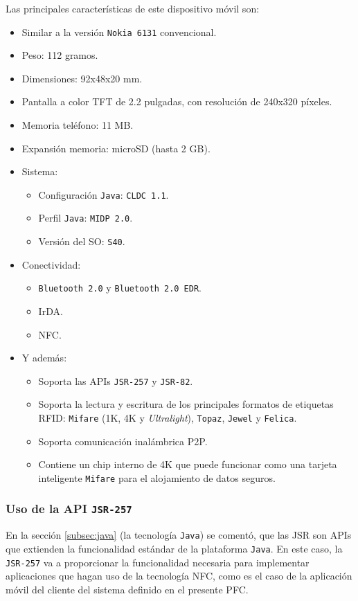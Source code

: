 Las principales características de este dispositivo móvil son:
\begin{itemize}
\item Similar a la versión \texttt{Nokia 6131} convencional.
\item Peso: 112 gramos.
\item Dimensiones: 92x48x20 mm.
\item Pantalla a color \acs{TFT} de 2.2 pulgadas, con resolución de 240x320 
píxeles.
\item Memoria teléfono: 11 MB.
\item Expansión memoria: microSD (hasta 2 GB).
\item Sistema:
  \begin{itemize}
  \item Configuración \texttt{Java}: \texttt{CLDC 1.1}.
  \item Perfil \texttt{Java}: \texttt{\acs{MIDP} 2.0}.
  \item Versión del \acs{SO}: \texttt{S40}.
  \end{itemize}
\item Conectividad:
  \begin{itemize}
  \item \texttt{Bluetooth 2.0} y \texttt{Bluetooth 2.0 EDR}.
  \item \acs{IrDA}.
  \item \acs{NFC}.
  \end{itemize}
\item Y además:
  \begin{itemize}
  \item Soporta las \acs{API}s \texttt{\acs{JSR}-257} y \texttt{\acs{JSR}-82}.
  \item Soporta la lectura y escritura de los principales formatos de
  etiquetas \acs{RFID}: \texttt{Mifare} (1K, 4K y \emph{Ultralight}),
  \texttt{Topaz}, \texttt{Jewel} y \texttt{Felica}.
  \item Soporta comunicación inalámbrica \acs{P2P}.
  \item Contiene un chip interno de 4K que puede funcionar como una tarjeta
  inteligente \texttt{Mifare} para el alojamiento de datos seguros.
  \end{itemize}
\end{itemize}


  \subsubsection{Uso de la \acs{API} \texttt{\acs{JSR}-257}}
En la sección \ref{subsec:java} (la tecnología \texttt{Java}) se comentó, que
las \acs{JSR} son \acs{API}s que extienden la funcionalidad estándar de la 
plataforma \texttt{Java}. En este caso, la \texttt{\acs{JSR}-257} va a
proporcionar la funcionalidad necesaria para implementar aplicaciones que
hagan uso de la tecnología \acs{NFC}, como es el caso de la aplicación móvil
del cliente del sistema definido en el presente \acs{PFC}.

